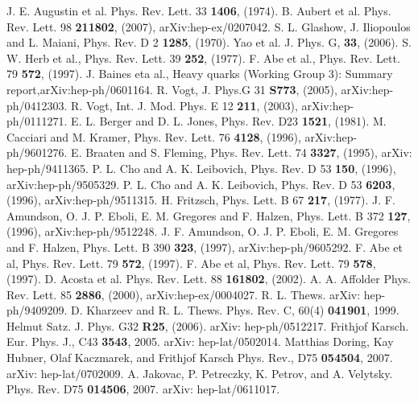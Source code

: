 \begin{thebibliography}{999}
 J. E. Augustin et al. Phys. Rev. Lett. 33 {\bf 1406}, (1974).
 B. Aubert et al. Phys. Rev. Lett. 98 {\bf 211802}, (2007), arXiv:hep-ex/0207042.
 S. L. Glashow, J. Iliopoulos and L. Maiani, Phys. Rev. D 2 {\bf 1285}, (1970).
 Yao et al. J. Phys. G, {\bf 33}, (2006).
 S. W. Herb et al., Phys. Rev. Lett. 39 {\bf 252}, (1977).
 F. Abe et al., Phys. Rev. Lett. 79 {\bf 572}, (1997).
 J. Baines eta al., Heavy quarks (Working Group 3): Summary report,arXiv:hep-ph/0601164.
 R. Vogt, J. Phys.G 31 {\bf S773}, (2005), arXiv:hep-ph/0412303.
 R. Vogt, Int. J. Mod. Phys. E 12 {\bf 211}, (2003), arXiv:hep-ph/0111271.
 E. L. Berger and D. L. Jones, Phys. Rev. D23 {\bf 1521}, (1981).
 M. Cacciari and M. Kramer, Phys. Rev. Lett. 76 {\bf 4128}, (1996), arXiv:hep-ph/9601276.
 E. Braaten and S. Fleming, Phys. Rev. Lett. 74 {\bf 3327}, (1995), arXiv: hep-ph/9411365.
 P. L. Cho and A. K. Leibovich, Phys. Rev. D 53 {\bf 150}, (1996),  arXiv:hep-ph/9505329.
 P. L. Cho and A. K. Leibovich, Phys. Rev. D 53 {\bf 6203}, (1996), arXiv:hep-ph/9511315.
 H. Fritzsch, Phys. Lett. B 67 {\bf 217}, (1977).
 J. F. Amundson, O. J. P. Eboli, E. M. Gregores and F. Halzen, Phys. Lett. B 372 {\bf 127}, (1996), arXiv:hep-ph/9512248.
 J. F. Amundson, O. J. P. Eboli, E. M. Gregores and F. Halzen, Phys. Lett. B 390 {\bf 323}, (1997), arXiv:hep-ph/9605292.
 F. Abe et al, Phys. Rev. Lett. 79 {\bf 572}, (1997).
 F. Abe et al, Phys. Rev. Lett. 79 {\bf 578}, (1997).
 D. Acosta et al. Phys. Rev. Lett. 88 {\bf 161802}, (2002).
 A. A. Affolder Phys. Rev. Lett. 85 {\bf 2886}, (2000), arXiv:hep-ex/0004027.
 R. L. Thews. arXiv: hep-ph/9409209.
 D. Kharzeev and R. L. Thews. Phys. Rev. C, 60(4) {\bf 041901}, 1999.
 Helmut Satz. J. Phys. G32 {\bf R25}, (2006). arXiv: hep-ph/0512217.
 Frithjof Karsch. Eur. Phys. J., C43 {\bf 3543}, 2005. arXiv: hep-lat/0502014.
 Matthias Doring, Kay Hubner, Olaf Kaczmarek, and Frithjof Karsch Phys. Rev., D75 {\bf 054504}, 2007. arXiv: hep-lat/0702009.
 A. Jakovac, P. Petreczky, K. Petrov, and A. Velytsky. Phys. Rev. D75 {\bf 014506}, 2007. arXiv: hep-lat/0611017.

\end{thebibliography}
